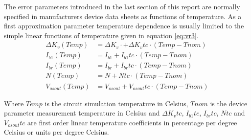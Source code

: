 
The error parameters introduced in the last section of this report are
normally specified in manufacturers device data sheets as functions of
temperature. As a first approximation parameter temperature dependence
is usually limited to the simple linear functions of temperature given
in equation \eqref{eq:vr3}.
\begin{align}
\label{eq:vr3}
\nonumber
\Delta K_v\left(Temp\right)&=\Delta K_v\cdot +\Delta K_vtc\cdot \left( Temp-Tnom\right)\\
\nonumber
I_{b1}\left(Temp\right)&=I_{b1}+I_{b1}tc\cdot \left( Temp-Tnom\right)\\
\nonumber
I_{br}\left(Temp\right)&=I_{br}+I_{br}tc\cdot \left( Temp-Tnom\right)\\
\nonumber
N\left(Temp\right)&=N+Ntc\cdot \left( Temp-Tnom\right)\\
V_{osout}\left(Temp\right)&=V_{osout}+V_{osout}tc\cdot \left( Temp-Tnom\right)
\end{align}

Where $Temp$ is the circuit simulation temperature in Celsius, $Tnom$
is the device parameter measurement temperature in Celsius and $\Delta
K_vtc$, $I_{b1}tc$, $I_{br}tc$, $Ntc$ and $V_{osout}tc$ are first order
linear temperature coefficients in percentage per degree Celsius or
units per degree Celsius.




